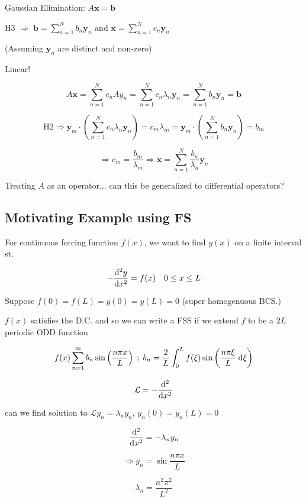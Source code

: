 \documentclass[a4paper]{article}
\begin{document}
Gaussian Elimination: $ A \mathbf{x} = \mathbf{b} $

H3 $ \Rightarrow \; \mathbf{b} = \sum_{n=1}^{N} b_{n} \mathbf{y}_{n} $
 and $ \mathbf{x} = \sum_{n=1}^{N} c_{n} \mathbf{y}_{n} $
 
 (Assuming $ \mathbf{y}_{n} $ are distinct and non-zero)
 
 Linear!
 
 \[ A \mathbf{x} = \sum_{n=1}^{N} c_{n} A y_{n} = \sum_{n=1}^{N} c_{n} \lambda_{n} \mathbf{y}_{n} = \sum_{n=1}^{N} b_{n} \mathbf{y}_{n} = \mathbf{b} \]
 
 \[\text{H2} \Rightarrow \mathbf{y}_{m} \cdot \left( \sum_{n=1}^{N} c_{n} \lambda_{n} \mathbf{y}_{n}  \right) = c_{m} \lambda_{m} = \mathbf{y}_{m} \cdot \left(  \sum_{n=1}^{N} b_{n} \mathbf{y}_{n}  \right) = b_{m}    \]
 
 \[ \Rightarrow c_{m} = \frac{b_{m}}{\lambda_{m}} \Rightarrow \mathbf{x} = \sum_{n=1}^{N} \frac{b_{n}}{\lambda_{n}} \mathbf{y}_{n} \]
 
 Treating $ A $ as an operator... can this be generalized to differential operators?
 
 
 \subsection{Motivating Example using FS}
 
 For continuous forcing function $ f(x) $, we want to find $ y(x) $ on a finite interval st.
 
 \[ - \frac{\mathrm{d}^{2} y }{\mathrm{d}  x^{2}} = f(x) \quad 0 \leq x \leq L \]

Suppose $ f(0) = f(L) = y(0) = y(L) = 0 $ (super homogenuous BCS.)

$ f(x) $ satisfies the D.C. and so we can write a FSS if we extend $ f $ to be a $ 2L $ periodic ODD function

\[ f(x) \sum_{n = 1 }^{\infty} b_{n} \sin \left(  \frac{n \pi x}{L} \right)  \; ; \; b_{n} = \frac{2}{L} \int_{0}^{L} f(\xi)  \sin \left( \frac{n \pi \xi}{L}  \; \mathrm{d} \xi \right)  \]


\[ \mathcal{L} = - \frac{\mathrm{d}^{2} }{\mathrm{d}  x^{2}} \]  

can we find solution to $ \mathcal{L} y_{n} = \lambda_{n} y_{n}  $, $ y_{n} (0) = y_{n}(L) = 0 $

\[ \frac{\mathrm{d}^{2} }{\mathrm{d}  x^{2}} = - \lambda_{n} y_{n}   \]

\[ \Rightarrow y_{n} = \sin \frac{n \pi x}{L} \]

\[ \lambda_{n} = \frac{n^{2} \pi^{2}}{L^{2}} \]
\end{document}
